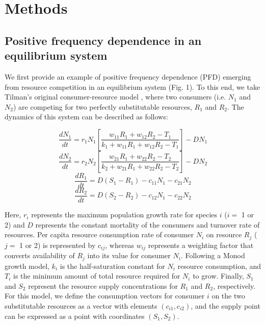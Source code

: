 \section{Methods}
\subsection{Positive frequency dependence in an equilibrium system}
We first provide an example of positive frequency dependence (PFD) emerging from resource competition in an equilibrium system (Fig. 1). To this end, we take Tilman's original consumer-resource model \citep[p.~270]{tilman1982}, where two consumers (i.e. $N_{1}$ and $N_{2}$) are competing for two perfectly substitutable resources, $R_{1}$ and $R_{2}$. The dynamics of this system can be described as follows:

\begin{equation}
\frac{{d{N_1}}}{{dt}} = {r_1}{N_1}\left[ {\frac{{{w_{11}}{R_1} + {w_{12}}{R_2} - {T_1}}}{{{k_1} + {w_{11}}{R_1} + {w_{12}}{R_2} - {T_1}}}} \right] - D{N_1} \tag{3.7}\label{eq:3.7}
\end{equation}
\begin{equation}
\frac{{d{N_2}}}{{dt}} = {r_2}{N_2}\left[ {\frac{{{w_{21}}{R_1} + {w_{22}}{R_2} - {T_2}}}{{{k_2} + {w_{21}}{R_1} + {w_{22}}{R_2} - {T_2}}}} \right] - D{N_2} \tag{3.8}\label{eq:3.8}
\end{equation}
\begin{equation}
\frac{{d{R_1}}}{{dt}} = D\left( {{S_1} - {R_1}} \right) - {c_{11}}{N_1} - {c_{21}}{N_2} \tag{3.9}\label{eq:3.9}
\end{equation}
\begin{equation}
\frac{{d{R_2}}}{{dt}} = D\left( {{S_2} - {R_2}} \right) - {c_{12}}{N_1} - {c_{22}}{N_2} \tag{3.10}\label{eq:3.10}
\end{equation}

Here, $r_{i}$ represents the maximum population growth rate for species $i$ ($i = $ 1 or 2) and $D$ represents the constant mortality of the consumers and turnover rate of resources. Per capita resource consumption rate of consumer $N_{i}$ on resource $R_{j}$ ($j = $ 1 or 2) is represented by $c_{ij}$, whereas $w_{ij}$ represents a weighting factor that converts availability of $R_{j}$ into its value for consumer $N_{i}$. Following a Monod growth model, $k_{i}$ is the half-saturation constant for $N_{i}$ resource consumption, and $T_{i}$ is the minimum amount of total resource required for $N_{i}$ to grow. Finally, $S_{1}$ and $S_{2}$ represent the resource supply concentrations for $R_{1}$ and $R_{2}$, respectively. For this model, we define the consumption vectors for consumer $i$ on the two substitutable resources as a vector with elements $\left( c_{i1}, c_{i2} \right)$, and the supply point can be expressed as a point with coordinates $\left( S_{1}, S_{2} \right)$. 
\par


